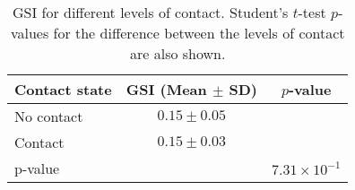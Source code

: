 \begin{table}
\centering
\caption{GSI for different levels of contact. Student's $t$-test $p$-values for the difference between the levels of contact are also shown.}
\label{tab:gsi_contact}
\begin{tabular}{lcc}
\toprule
Contact state & GSI (Mean $\pm$ SD) & $p$-value \\ 
\midrule
No contact & $0.15 \pm 0.05$ & \\ 
Contact & $0.15 \pm 0.03$ & \\ 
\midrule
p-value & & $7.31 \times 10^{-1}$ \\ 
\bottomrule
\end{tabular}
\end{table}
